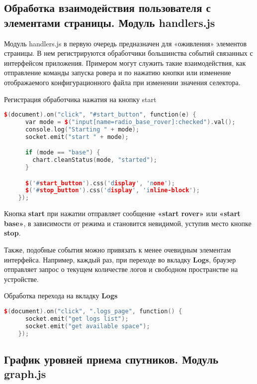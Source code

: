 \subsection{Обработка взаимодействия пользователя с элементами страницы. Модуль handlers.js} \label{subsect3_2_3}

Модуль handlers.js в первую очередь предназначен для «оживления» элементов страницы. В нем регистрируются обработчики большинства событий связанных с интерфейсом приложения. Примером могут служить такие взаимодействия, как отправление команды запуска ровера и по нажатию кнопки или изменение отображаемого конфигурационного файла при изменении значения селектора.

\begin{ListingEnv}[H]
  \caption{Регистрация обработчика нажатия на кнопку start}
  \label{list:hwbeauty}
  \begin{lstlisting}[language=C++]
    $(document).on("click", "#start_button", function(e) {
      var mode = $("input[name=radio_base_rover]:checked").val();
      console.log("Starting " + mode);
      socket.emit("start " + mode);

      if (mode == "base") {
        chart.cleanStatus(mode, "started");
      }

      $('#start_button').css('display', 'none');
      $('#stop_button').css('display', 'inline-block');
    });
  \end{lstlisting}
\end{ListingEnv}

Кнопка \textbf{start} при нажатии отправляет сообщение \textbf{«start rover»} или \textbf{«start base»}, в зависимости от режима и становится невидимой, уступив место кнопке \textbf{stop}.

Также, подобные события можно привязать к менее очевидным элементам интерфейса. Например, каждый раз, при переходе во вкладку \textbf{Logs}, браузер отправляет запрос о текущем количестве логов и свободном пространстве на устройстве.

\begin{ListingEnv}[H]
  \caption{Обработка перехода на вкладку \textbf{Logs}}
  \label{list:hwbeauty}
  \begin{lstlisting}[language=C++]
    $(document).on("click", ".logs_page", function() {
      socket.emit("get logs list");
      socket.emit("get available space");
    });
  \end{lstlisting}
\end{ListingEnv}

\subsection{График уровней приема спутников. Модуль graph.js} \label{subsect3_2_3}

